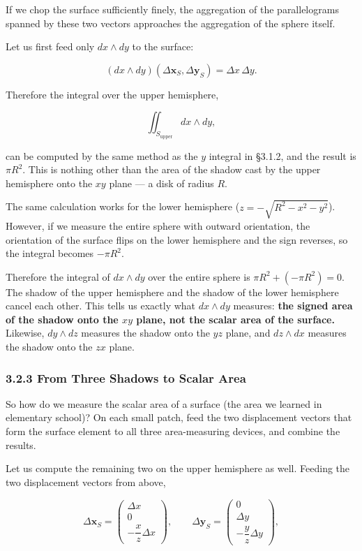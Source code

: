 \documentclass[a4paper,12pt,openany]{book}
\begin{document}
If we chop the surface sufficiently finely, the aggregation of the
parallelograms spanned by these two vectors approaches the aggregation
of the sphere itself.

Let us first feed only \(dx \wedge dy\) to the surface:

\[(dx \wedge dy)(\Delta\mathbf{x}_S,\Delta\mathbf{y}_S)=\Delta x\,\Delta y.\]

Therefore the integral over the upper hemisphere,

\[
\iint_{S_{\text{upper}}} dx \wedge dy,
\]

can be computed by the same method as the \(y\) integral in §3.1.2, and
the result is \(\pi R^2\). This is nothing other than the area of the
shadow cast by the upper hemisphere onto the \(xy\) plane — a disk of
radius \(R\).

The same calculation works for the lower hemisphere
(\(z = -\sqrt{R^2 - x^2 - y^2}\)). However, if we measure the entire
sphere with outward orientation, the orientation of the surface flips on
the lower hemisphere and the sign reverses, so the integral becomes
\(-\pi R^2\).

Therefore the integral of \(dx \wedge dy\) over the entire sphere is
\(\pi R^2 + (-\pi R^2) = 0\). The shadow of the upper hemisphere and the
shadow of the lower hemisphere cancel each other. This tells us exactly
what \(dx \wedge dy\) measures:
\textbf{the signed area of the shadow onto the $xy$ plane, not the scalar area of the surface.}
Likewise, \(dy \wedge dz\) measures the shadow onto the \(yz\) plane,
and \(dz \wedge dx\) measures the shadow onto the \(zx\) plane.

\hypertarget{from-three-shadows-to-scalar-area}{%
\subsubsection{3.2.3 From Three Shadows to Scalar
Area}\label{from-three-shadows-to-scalar-area}}

So how do we measure the scalar area of a surface (the area we learned
in elementary school)? On each small patch, feed the two displacement
vectors that form the surface element to all three area-measuring
devices, and combine the results.

Let us compute the remaining two on the upper hemisphere as well.
Feeding the two displacement vectors from above,

\[\Delta\mathbf{x}_S=\begin{pmatrix}\Delta x\\0\\-\dfrac{x}{z}\Delta x\end{pmatrix},\qquad
\Delta\mathbf{y}_S=\begin{pmatrix}0\\\Delta y\\-\dfrac{y}{z}\Delta y\end{pmatrix},\]
\end{document}
